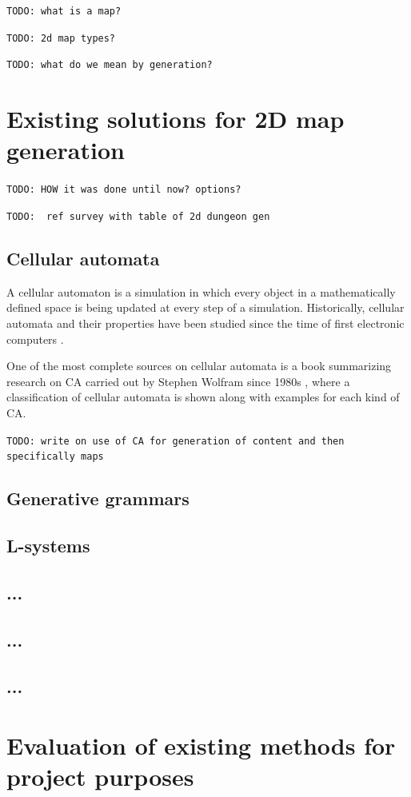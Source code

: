 \documentclass[12pt]{report}
\newcommand{\todo}[1]{}
\renewcommand{\todo}[1]{{\color{red} \par \noindent \footnotesize \texttt{TODO: {#1} }}}
\begin{document}
\todo{what is a map?}
\todo{2d map types?}
\todo{what do we mean by generation?}



\section{Existing solutions for 2D map generation}

\todo{HOW it was done until now? options?}
\todo{ ref survey with table of 2d dungeon gen}

\subsection{Cellular automata}

A cellular automaton is a simulation in which every object in a mathematically defined space is being updated at every step of a simulation. Historically, cellular automata and their properties have been studied since the time of first electronic computers \autocite{Sarkar:2000:BHC:349194.349202}.

One of the most complete sources on cellular automata is a book summarizing research on CA carried out by Stephen Wolfram since 1980s \autocite{wolfram2002new}, where a classification of cellular automata is shown along with examples for each kind of CA. 

\todo{write on use of CA for generation of content and then specifically maps }


\subsection{Generative grammars}
\subsection{L-systems}
\subsection{...}
\subsection{...}
\subsection{...}
\section{Evaluation of existing methods for project purposes}
\end{document}
